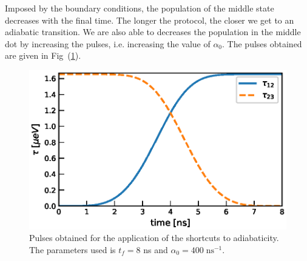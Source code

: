 \documentclass[a4paper,11pt]{article}
\begin{document}
Imposed by the boundary conditions, the population of the middle state decreases with the final time. The longer the protocol, the closer we get to an adiabatic transition. We are also able to decreases the population in the middle dot by increasing the pulses, i.e. increasing the value of $\alpha_0$. The pulses obtained are given in Fig~(\ref{fig:STA_TQD_Pulses}).
\begin{figure}[!htbp]
	\centering
	\includegraphics[width=0.7\linewidth]{STA_TQD_Pulses.eps}
	\caption{Pulses obtained for the application of the shortcuts to adiabaticity. The parameters used is $t_f=8$ ns and $\alpha_0=400\; \text{ns}^{-1}$.}
	\label{fig:STA_TQD_Pulses}
\end{figure}
\end{document}
